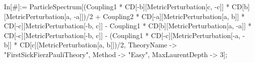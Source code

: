 In[#]:= ParticleSpectrum[(Coupling1 * CD[-b][MetricPerturbation[c, -c]] * CD[b][MetricPerturbation[a, -a]])/2 + Coupling2 * CD[-a][MetricPerturbation[a, b]] * CD[-c][MetricPerturbation[-b, c]] - Coupling1 * CD[b][MetricPerturbation[a, -a]] * CD[-c][MetricPerturbation[-b, c]] - (Coupling1 * CD[-c][MetricPerturbation[-a, -b]] * CD[c][MetricPerturbation[a, b]])/2, TheoryName -> "FirstSickFierzPauliTheory", Method -> "Easy", MaxLaurentDepth -> 3]; 